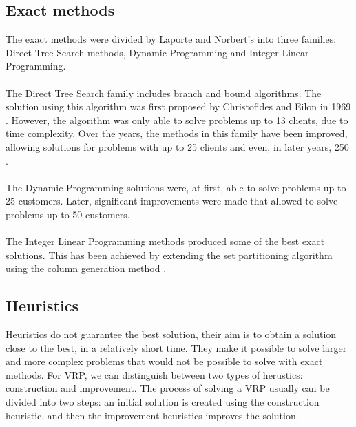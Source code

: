 \documentclass[a4paper,twoside,12pt]{book}
\begin{document}
\subsection{Exact methods}
The exact methods were divided by Laporte and Norbert's into three families: Direct Tree Search methods, Dynamic Programming and Integer Linear Programming. \cite{bib:chapter:ExactMethods}
\paragraph{}
The Direct Tree Search family includes branch and bound algorithms. The solution using this algorithm was first proposed by Christofides and Eilon in 1969 \cite{bib:article:Eilon}. However, the algorithm was only able to solve problems up to 13 clients, due to time complexity. Over the years, the methods in this family have been improved, allowing solutions for problems with up to 25 \cite{bib:article:LowerBound} clients and even, in later years, 250 \cite{bib:article:Laporte}.
\paragraph{}
The Dynamic Programming solutions were, at first, able to solve problems up to 25 customers. Later, significant improvements were made that allowed to solve problems up to 50 customers.
\paragraph{}
The Integer Linear Programming methods produced some of the best exact solutions. This has been achieved by extending the set partitioning algorithm using the column generation method \cite{bib:article:ILP}. 

\subsection{Heuristics}
Heuristics do not guarantee the best solution, their aim is to obtain a solution close to the best, in a relatively short time. They make it possible to solve larger and more complex problems that would not be possible to solve with exact methods. For VRP, we can distinguish between two types of herustics: construction and improvement. The process of solving a VRP usually can be divided into two steps: an initial solution is created using the construction heuristic, and then the improvement heuristics improves the solution. 
\end{document}
